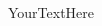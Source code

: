 \documentclass[preview]{standalone}
\begin{document}
\begin{CJK*}{GBK}{hwzs}

YourTextHere

\end{CJK*}
\end{document}
